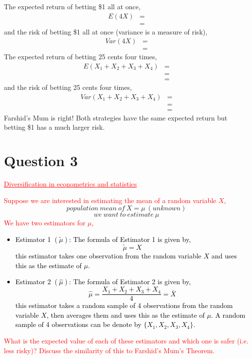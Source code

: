 \documentclass[12pt]{report}
\begin{document}
\noindent The expected return of betting \$1 all at once,
\begin{align*}
	E(4X)&= \\
	&=
\end{align*} \noindent and the risk of betting \$1 all at once (variance is a measure of risk),
\begin{align*}
Var(4X)&= \\
&=
\end{align*} \noindent The expected return of betting 25 cents four times,
\begin{align*}
E(X_1+X_2+X_3+X_4)&= \\
&= \\
&=
\end{align*}
\noindent and the risk of betting 25 cents four times,
\begin{align*}
Var(X_1+X_2+X_3+X_4)&= \\
&= \\
&=
\end{align*}
\noindent Farshid's Mum is right! Both strategies have the same expected return but betting \$1 has a much larger risk. 

\newpage
\section*{Question 3}
\textcolor{red}{\underline{Diversification in econometrics and statistics}}

\noindent \textcolor{red}{Suppose we are interested in estimating the mean of a random variable $X$,}
\noindent $$population\ mean\ of\ X = \mu\ (unknown)$$
\noindent $$we\ want\ to\ estimate\ \mu$$
\noindent \textcolor{red}{We have two estimators for $\mu$,}
\noindent \textcolor{black}{\begin{itemize}
		\item Estimator 1 $(\tilde{\mu})$: The formula of Estimator 1 is given by, $$\tilde{\mu} = X$$  this estimator takes one observation from the random variable $X$ and uses this as the estimate of $\mu$. 
		\item Estimator 2 $(\hat{\mu})$: The formula of Estimator 2 is given by, $$\hat{\mu} = \dfrac{X_1+X_2+X_3+X_4}{4} = \bar{X}$$ this estimator takes a random sample of 4 observations from the random variable $X$, then averages them and uses this as the estimate of $\mu$. A random sample of 4 observations can be denote by $\{X_1,X_2,X_3,X_4\}$. 
	\end{itemize}}
\noindent \textcolor{red}{What is the expected value of each of these estimators and which one is safer (i.e. less risky)? Discuss the similarity of this to Farshid's Mum's Theorem.}
\end{document}
